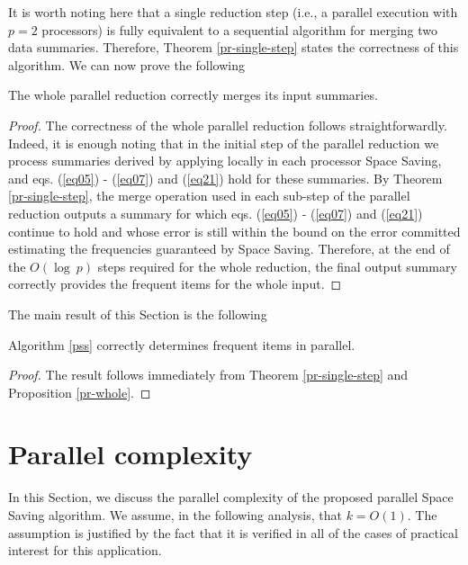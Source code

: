 \documentclass[final,3p,times]{elsarticle}
\newcommand\noi{\noindent}
\begin{document}
\noi It is worth noting here that a single reduction step (i.e., a parallel execution with $p = 2$ processors) is fully equivalent to a sequential algorithm for merging two data summaries. Therefore, Theorem \ref{pr-single-step} states the correctness of this algorithm.  We can now prove the following

\begin{prop}
\label{pr-whole}
The whole parallel reduction correctly merges its input summaries.
\end{prop}

\begin{proof}

The correctness of the whole parallel reduction follows straightforwardly. Indeed, it is enough noting that in the initial step of the parallel reduction we process summaries derived by applying locally in each processor Space Saving, and eqs. (\ref{eq05}) - (\ref{eq07}) and (\ref{eq21}) hold for these summaries. By Theorem \ref{pr-single-step}, the merge operation used in each sub-step of the parallel reduction outputs a summary for which eqs. (\ref{eq05}) - (\ref{eq07}) and (\ref{eq21}) continue to hold and whose error is still within the bound on the error committed estimating the frequencies guaranteed by Space Saving. Therefore, at the end of the $O(\log~p)$ steps required for the whole reduction, the final output summary correctly provides the frequent items for the whole input.

\end{proof}

The main result of this Section is the following 

\begin{thm} Algorithm \ref{pss} correctly determines frequent items in parallel.
\end{thm}

\begin{proof}
The result follows immediately from Theorem \ref{pr-single-step} and Proposition \ref{pr-whole}.
\end{proof}


\section{Parallel complexity}
\label{pss-analysis}
In this Section, we discuss the parallel complexity of the proposed parallel Space Saving algorithm. We assume, in the following analysis, that $k = O(1)$. The assumption is justified by the fact that it is verified in all of the cases of practical interest for this application.
\end{document}
